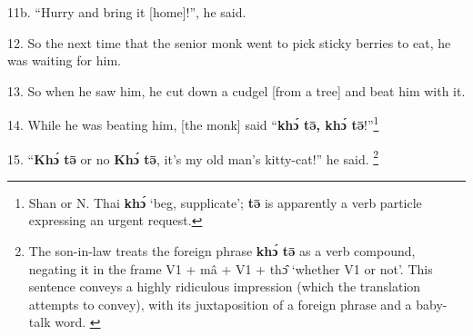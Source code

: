 11b. ``Hurry and bring it [home]!'', he said.

12. So the next time that the senior monk went to pick sticky berries to eat, he
was waiting for him.

13. So when he saw him, he cut down a cudgel [from a tree] and beat him with it.

14. While he was beating him, [the monk] said ``\textbf{khɔ́ tə̄, khɔ́ tə̄}!''\footnote{Shan or N. Thai \textbf{khɔ́ }`beg, supplicate'; \textbf{tə̄} is\textbf{ }apparently a verb particle expressing an urgent request.}

15. ``\textbf{Khɔ́ tə̄} or no \textbf{Khɔ́ tə̄},\textbf{ }it's my old man's
kitty-cat!'' he said. \footnote{The son-in-law treats the foreign phrase \textbf{khɔ́ tə̄ }as a verb compound, negating it in the frame V1 + mâ + V1 + thɔ̂ `whether V1 or not'. This sentence conveys a highly ridiculous impression (which the translation attempts to convey), with its juxtaposition of a foreign phrase and a baby-talk word.\textbf{ }}

